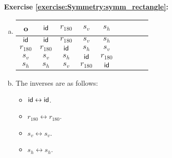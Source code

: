 \noindent\textbf{Exercise \ref{exercise:Symmetry:symm_rectangle}:}\\ 
\begin{enumerate}[(a)]
\item
\begin{tabular}{c| c c c c c c c c }
		o & $\sf{id}$ & $r_{180}$ & $s_v$ & $s_h$ \\
		\hline
		$\sf{id}$ & $\sf{id}$ & $r_{180}$ & $s_v$ & $s_h$\\
		$r_{180}$ & $r_{180}$ & $\sf{id}$ & $s_h$ & $s_v$\\
		$s_v$ & $s_v$ & $s_h$ & $\sf{id}$ & $r_{180}$\\
		$s_h$ & $s_h$ & $s_v$ & $r_{180}$ & $\sf{id}$\\
	\end{tabular}
	
\item
The inverses are as follows:
	\begin{multicols}{2}
	\begin{itemize}
	\item
	$\sf{id} \leftrightarrow \sf{id}$.
	
	\item
	$r_{180} \leftrightarrow r_{180}$.
	
	\item
	$s_v \leftrightarrow s_v$.
	
	\item
	$s_h \leftrightarrow s_h$.
	\end{itemize}
	\end{multicols}
\end{enumerate}

